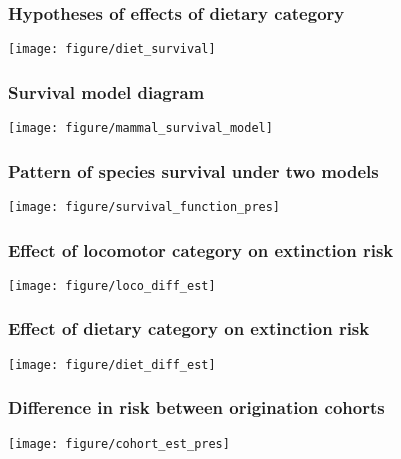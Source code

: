\documentclass{beamer}
\begin{document}
\begin{frame}
  \frametitle{Hypotheses of effects of dietary category}
  \begin{center}
    \texttt{[image: figure/diet\_survival]}
  \end{center}
\end{frame}

\begin{frame}
  \frametitle{Survival model diagram}
  \begin{center}
    \texttt{[image: figure/mammal\_survival\_model]}
  \end{center}
\end{frame}

\begin{frame}
  \frametitle{Pattern of species survival under two models}

  \begin{center}
    \texttt{[image: figure/survival\_function\_pres]}
  \end{center}

  \tiny{}
\end{frame}

\begin{frame}
  \frametitle{Effect of locomotor category on extinction risk}

  \begin{center}
    \texttt{[image: figure/loco\_diff\_est]}
  \end{center}

  \tiny{}
\end{frame}

\begin{frame}
  \frametitle{Effect of dietary category on extinction risk}

  \begin{center}
    \texttt{[image: figure/diet\_diff\_est]}
  \end{center}

  \tiny{}
\end{frame}

\begin{frame}
  \frametitle{Difference in risk between origination cohorts}

  \begin{center}
    \texttt{[image: figure/cohort\_est\_pres]}
  \end{center}

  \tiny{}
\end{frame}
\end{document}
